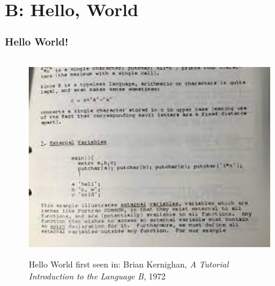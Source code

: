 \section{B: Hello, World}

\begin{frame}[fragile]
\frametitle{Hello World!}

\begin{columns}
\begin{column}{0.5\textwidth}
\begin{figure}[h]
\centerline{
\includegraphics[width=1.0\textwidth]{../Figs/hello-in-b.jpg}
}
\centerline{
{\tiny Hello World first seen in: Brian Kernighan, {\it A Tutorial Introduction to the Language B}, 1972}
}
\end{figure}
\end{column}

\begin{column}{0.45\textwidth}

\end{column}

\end{columns}
\end{frame}



